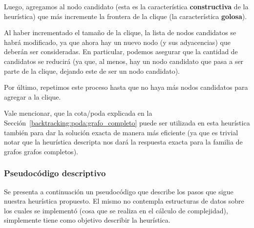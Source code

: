 \par Luego, agregamos al nodo candidato (esta es la caracter\'istica \textbf{constructiva}
    de la heur\'istica) que m\'as incremente la frontera de la clique (la
    caracter\'istica \textbf{golosa}).

\par Al haber incrementado el tama\~no de la clique, la lista de
    nodos candidatos se habr\'a modificado, ya que ahora hay un nuevo
    nodo (y sus adyacencias) que deber\'an ser consideradas. En particular,
    podemos asegurar que la cantidad de candidatos se reducir\'a (ya que,
    al menos, hay un nodo candidato que pasa a ser parte de la clique,
    dejando este de ser un nodo candidato).

\par Por \'ultimo, repetimos este proceso hasta que no haya m\'as
    nodos candidatos para agregar a la clique.

\par Vale mencionar, que la cota/poda \emph{}
    explicada en la Secci\'on~\ref{backtracking:poda:grafo_completo} puede
    ser utilizada en esta heur\'istica tambi\'en para dar la soluci\'on
    exacta de manera m\'as eficiente (ya que es trivial notar que la heur\'istica
    descripta nos dar\'a la respuesta exacta para la familia de grafos
    grafos completos).

\bigskip

\subsubsection{Pseudoc\'odigo descriptivo}
\par Se presenta a continuaci\'on un pseudoc\'odigo que describe los pasos que sigue
    nuestra heur\'istica propuesto. El mismo no contempla estructuras de datos sobre
    los cuales se implement\'o (cosa que se realiza en el c\'alculo de complejidad),
    simplemente tiene como objetivo describir la heur\'istica.

